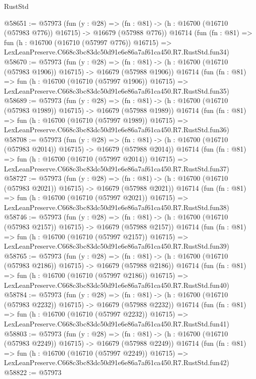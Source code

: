 \begin{lexlean}{RustStd}
\begin{coremodule}
@58651 := @57973
    (fun (y : @28) =>
    (fn : @81) -> (h : @16700 (@16710 (@57983 @776)) @16715) -> @16679 (@57988 @776))
    @16714
    (fun (fn : @81) =>
    fun (h : @16700 (@16710 (@57997 @776)) @16715) =>
    LexLeanPreserve.C668c3bc83dc50d91e6e86a7af61ca450.R7.RustStd.fun34)
@58670 := @57973
    (fun (y : @28) =>
    (fn : @81) -> (h : @16700 (@16710 (@57983 @1906)) @16715) -> @16679 (@57988 @1906))
    @16714
    (fun (fn : @81) =>
    fun (h : @16700 (@16710 (@57997 @1906)) @16715) =>
    LexLeanPreserve.C668c3bc83dc50d91e6e86a7af61ca450.R7.RustStd.fun35)
@58689 := @57973
    (fun (y : @28) =>
    (fn : @81) -> (h : @16700 (@16710 (@57983 @1989)) @16715) -> @16679 (@57988 @1989))
    @16714
    (fun (fn : @81) =>
    fun (h : @16700 (@16710 (@57997 @1989)) @16715) =>
    LexLeanPreserve.C668c3bc83dc50d91e6e86a7af61ca450.R7.RustStd.fun36)
@58708 := @57973
    (fun (y : @28) =>
    (fn : @81) -> (h : @16700 (@16710 (@57983 @2014)) @16715) -> @16679 (@57988 @2014))
    @16714
    (fun (fn : @81) =>
    fun (h : @16700 (@16710 (@57997 @2014)) @16715) =>
    LexLeanPreserve.C668c3bc83dc50d91e6e86a7af61ca450.R7.RustStd.fun37)
@58727 := @57973
    (fun (y : @28) =>
    (fn : @81) -> (h : @16700 (@16710 (@57983 @2021)) @16715) -> @16679 (@57988 @2021))
    @16714
    (fun (fn : @81) =>
    fun (h : @16700 (@16710 (@57997 @2021)) @16715) =>
    LexLeanPreserve.C668c3bc83dc50d91e6e86a7af61ca450.R7.RustStd.fun38)
@58746 := @57973
    (fun (y : @28) =>
    (fn : @81) -> (h : @16700 (@16710 (@57983 @2157)) @16715) -> @16679 (@57988 @2157))
    @16714
    (fun (fn : @81) =>
    fun (h : @16700 (@16710 (@57997 @2157)) @16715) =>
    LexLeanPreserve.C668c3bc83dc50d91e6e86a7af61ca450.R7.RustStd.fun39)
@58765 := @57973
    (fun (y : @28) =>
    (fn : @81) -> (h : @16700 (@16710 (@57983 @2186)) @16715) -> @16679 (@57988 @2186))
    @16714
    (fun (fn : @81) =>
    fun (h : @16700 (@16710 (@57997 @2186)) @16715) =>
    LexLeanPreserve.C668c3bc83dc50d91e6e86a7af61ca450.R7.RustStd.fun40)
@58784 := @57973
    (fun (y : @28) =>
    (fn : @81) -> (h : @16700 (@16710 (@57983 @2232)) @16715) -> @16679 (@57988 @2232))
    @16714
    (fun (fn : @81) =>
    fun (h : @16700 (@16710 (@57997 @2232)) @16715) =>
    LexLeanPreserve.C668c3bc83dc50d91e6e86a7af61ca450.R7.RustStd.fun41)
@58803 := @57973
    (fun (y : @28) =>
    (fn : @81) -> (h : @16700 (@16710 (@57983 @2249)) @16715) -> @16679 (@57988 @2249))
    @16714
    (fun (fn : @81) =>
    fun (h : @16700 (@16710 (@57997 @2249)) @16715) =>
    LexLeanPreserve.C668c3bc83dc50d91e6e86a7af61ca450.R7.RustStd.fun42)
@58822 := @57973

\end{coremodule}
\end{lexlean}
